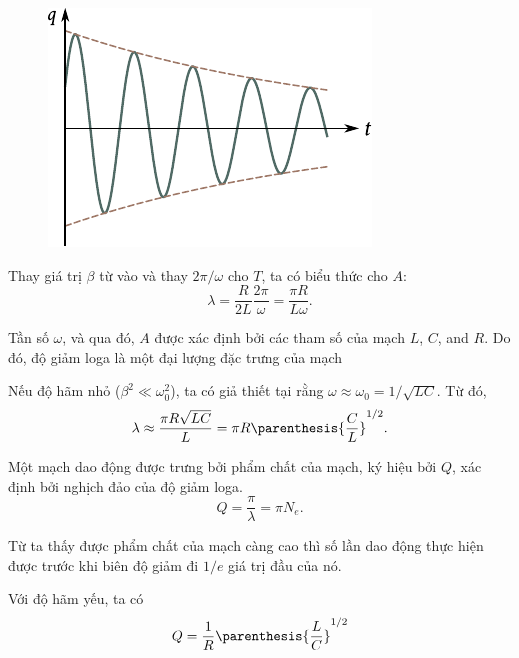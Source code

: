 \begin{figure}[t]
	\begin{center}
		\includegraphics[scale=1]{figures/ch_13/fig_13_4.pdf}
		\caption[]{}
		\label{fig:13_4}
	\end{center}
	\vspace{-0.8cm}
\end{figure}

Thay giá trị $\beta$ từ  vào  và thay $2\pi/\omega$ cho $T$, ta có biểu thức cho $A$:
\begin{equation}\label{eq:13_19}
    \lambda = \frac{R}{2L} \frac{2\pi}{\omega} = \frac{\pi R}{L\omega}.
\end{equation}

\noindent
Tần số $\omega$, và qua đó, $A$ được xác định bởi các tham số của mạch $L$, $C$, and $R$.
Do đó, độ giảm loga là một đại lượng đặc trưng của mạch

Nếu độ hãm nhỏ ($\beta^2\ll\omega_0^2$), ta có giả thiết tại  rằng $\omega\approx\omega_0 = 1/\sqrt{LC}$.
Từ đó,
\begin{equation}\label{eq:13_20}
    \lambda \approx \frac{\pi R \sqrt{LC}}{L} = \pi R \parenthesis{\frac{C}{L}}^{1/2}.
\end{equation}

Một mạch dao động được trưng bởi phẩm chất của mạch, ký hiệu bởi $Q$, xác định bởi nghịch đảo của độ giảm loga.
\vspace{-12pt}
\begin{equation}\label{eq:13_21}
    Q = \frac{\pi}{\lambda} = \pi N_e.
\end{equation}

\noindent
Từ  ta thấy được phẩm chất của mạch càng cao thì số lần dao động thực hiện được trước khi biên độ giảm đi $1/e$ giá trị đầu của nó.

Với độ hãm yếu, ta có
\begin{equation}\label{eq:13_22}
    Q = \frac{1}{R} \parenthesis{\frac{L}{C}}^{1/2}
\end{equation}

